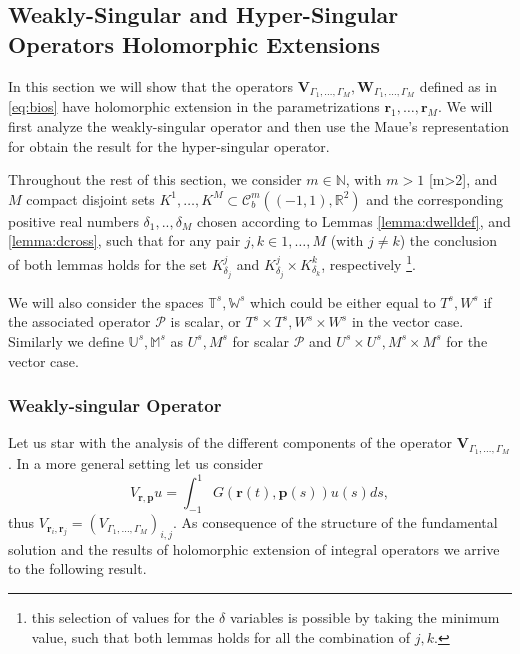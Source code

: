 \documentclass{article}
\newcommand{\todo}[1]{{\color{red}[#1]}}
\newcommand{\IN}{{\mathbb N}}
\newcommand{\IR}{{\mathbb R}}
\newcommand{\bp}{{\bm p}}
\newcommand{\rgeo}[1]{\mathcal{C}_b^{#1}\left( (-1,1), \IR^2 \right)}
\newcommand{\cP}{\mathcal{P}}
\newcommand{\br}{\bm{r}}
\begin{document}
\subsection{Weakly-Singular and Hyper-Singular Operators Holomorphic Extensions}
In this section we will show that the operators $\mathbf{V}_{\Gamma_1,\hdots,\Gamma_M}, \mathbf{W}_{\Gamma_1,\hdots,\Gamma_M}$ defined as in \eqref{eq:bios} have holomorphic extension in the parametrizations $\br_1,\hdots,\br_M$. We will first analyze the weakly-singular operator and then use the Maue's representation for obtain the result for the hyper-singular operator. 

Throughout the rest of this section, we consider $ m \in \IN$, with $m >1$ \todo{m>2}, and $M$ compact disjoint sets $K^1,\hdots,K^M \subset \rgeo{m}$ and the corresponding positive real numbers $\delta_1, ..,\delta_M$ chosen according to Lemmas \ref{lemma:dwelldef}, and \ref{lemma:dcross}, such that for any pair $j,k \in 1,\hdots,M$ (with $j\neq k$) the conclusion of both lemmas holds for the set $K^j_{\delta_j}$ and $ K^j_{\delta_j}\times K^k_{\delta_k}$, respectively \footnote{this selection of values for the $\delta$ variables is possible by taking the minimum value, such that both lemmas holds for all the combination of $j,k$. }. 

We will also consider the spaces $\mathbb{T}^s, \mathbb{W}^s$ which could be either equal to $T^s,W^s$ if the associated operator $\cP$ is scalar, or $T^s\times T^s,W^s\times W^s$ in the vector case. Similarly we define $\mathbb{U}^s, \mathbb{M}^s$ as $U^s,M^s$ for scalar $\cP$ and $U^s\times U^s,M^s\times M^s$ for the vector case.


\subsubsection{Weakly-singular Operator}

Let us star with the analysis of the different components of the operator 
$\mathbf{V}_{\Gamma_1,\hdots,\Gamma_M}$. In a more general setting let us consider 
$$V_{\br,\bp}u  = \int_{-1}^1G(\br(t),\bp(s)) u(s) ds,$$
thus $V_{\br_i, \br_j} = (V_{\Gamma_1,\hdots,\Gamma_M})_{i,j}$. As consequence of the structure of the fundamental solution and the results of holomorphic extension of integral operators we arrive to the following result. 
\end{document}
